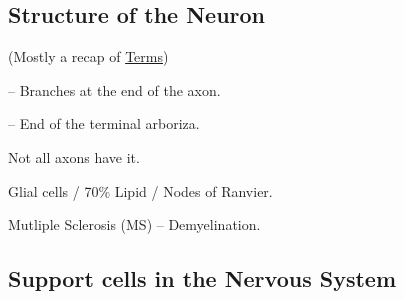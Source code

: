 \subsection{Structure of the Neuron}
(Mostly a recap of \hyperref[Terms]{Terms})
\begin{coloredlist}
    \item {}
    \item {}
    \item {}
    \item {} -- Branches at the end of the axon.
    \item {} -- End of the terminal arboriza.
    \item {}
    \item {}
    \begin{coloredlist}
        \item Not all axons have it.
        \item Glial cells / 70\% Lipid / Nodes of Ranvier.
        \item Mutliple Sclerosis (MS) -- Demyelination.
    \end{coloredlist}
\end{coloredlist}

\subsection{Support cells in the Nervous System}

